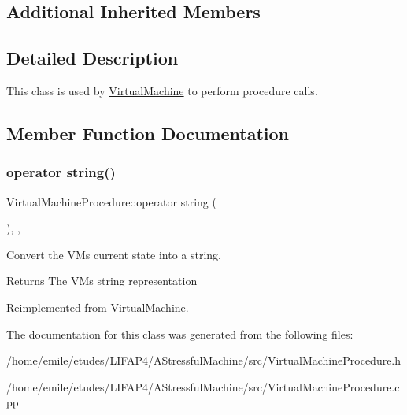 \subsection*{Additional Inherited Members}


\subsection{Detailed Description}
This class is used by \hyperlink{classVirtualMachine}{Virtual\+Machine} to perform procedure calls. 

\subsection{Member Function Documentation}
\mbox{\label{classVirtualMachineProcedure_aea6310148a612586e5fd9e30650decb6}} 
\subsubsection{\texorpdfstring{operator string()}{operator string()}}
{\footnotesize\ttfamily Virtual\+Machine\+Procedure\+::operator string (\begin{DoxyParamCaption}{ }\end{DoxyParamCaption})\hspace{0.3cm}{\ttfamily [explicit]}, {\ttfamily [override]}, {\ttfamily [virtual]}}

Convert the VM\textquotesingle{}s current state into a string. \begin{DoxyReturn}{Returns}
The VM\textquotesingle{}s string representation 
\end{DoxyReturn}


Reimplemented from \hyperlink{classVirtualMachine_ab12bb31d1f511018a0a8e956efb72591}{Virtual\+Machine}.



The documentation for this class was generated from the following files\+:\begin{DoxyCompactItemize}
\item 
/home/emile/etudes/\+L\+I\+F\+A\+P4/\+A\+Stressful\+Machine/src/Virtual\+Machine\+Procedure.\+h\item 
/home/emile/etudes/\+L\+I\+F\+A\+P4/\+A\+Stressful\+Machine/src/Virtual\+Machine\+Procedure.\+cpp\end{DoxyCompactItemize}
